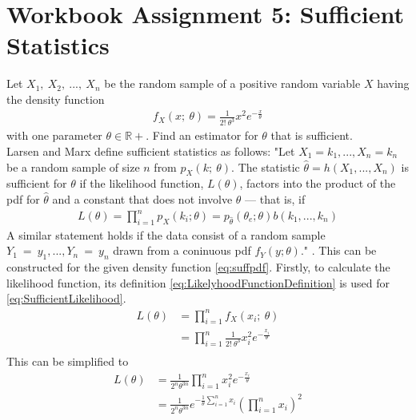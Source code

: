 \chapter{Workbook Assignment 5: Sufficient Statistics}	
Let $X_1,~X_2,~...,~X_n$ be the random sample of a positive random variable $X$ having the density function 
\begin{equation}
\begin{split}
f_X(x;~\theta) = \frac{1}{2!~\theta^3}x^2e^{-\frac{x}{\theta}}
\end{split}
\label{eq:suffpdf}
\end{equation}
with one parameter $\theta \in \mathbb{R}+$. Find an estimator for $\theta$ that is sufficient. 
\\
Larsen and Marx define sufficient statistics as follows: "Let $X_1 = k_1, . . . , X_n = k_n$ be a random sample of size $n$ from $p_X(k;~\theta)$. The statistic $\hat{\theta} = h(X_1, . . . , X_n)$ is sufficient for $\theta$ if the likelihood function, $L(\theta)$, factors into the product of the pdf for $\hat{\theta}$ and a constant that does not involve $\theta$ — that is, if
\begin{equation}
\begin{split}
L(\theta) 
= \prod_{i=1}^n p_X(k_i;\theta)
=p_{\hat{\theta}}(\theta_e;\theta)b(k_1,...,k_n)
\end{split}
\label{eq:SufficientLikelihood}
\end{equation}
A similar statement holds if the data consist of a random sample $Y_1~=~y_1,...,Y_n~=~ y_n$ drawn from a coninuous pdf $f_Y(y;\theta)$." \cite{larsen2005introduction}.
This can be constructed for the given density function \eqref{eq:suffpdf}. Firstly, to calculate the likelihood function, its definition \eqref{eq:LikelyhoodFunctionDefinition} is used for \eqref{eq:SufficientLikelihood}.
\begin{equation}
\begin{split}
L(\theta) 
&= \prod_{i=1}^n f_X(x_i;~\theta)\\
&= \prod_{i=1}^n \frac{1}{2!~\theta^3}x_i^2e^{-\frac{x_i}{\theta}}\\
\end{split}
\label{eq:SufficientLikelihood2}
\end{equation}
This can be simplified to 
\begin{equation}
\begin{split}
L(\theta) 
&= \frac{1}{2^n\theta^{3n}}\prod_{i=1}^n x_i^2e^{-\frac{x_i}{\theta}}\\
&= \frac{1}{2^n\theta^{3n}} e^{-\frac{1}{\theta}\sum_{i=1}^nx_i} \left(\prod_{i=1}^n x_i\right)^2\\
\end{split}
\label{eq:SufficientLikelihood3}
\end{equation}
